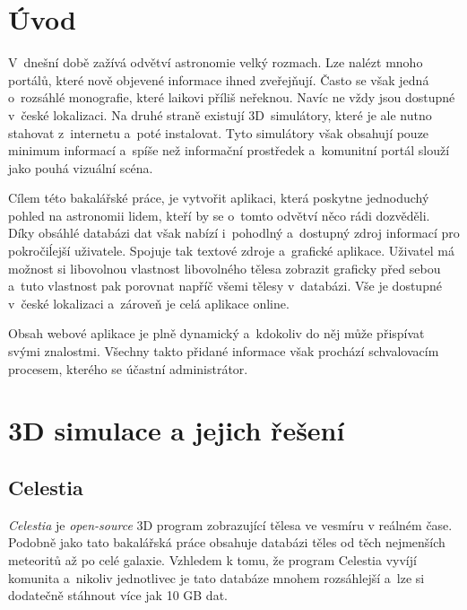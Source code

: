 \documentclass[a4paper,12pt]{article}
\begin{document}

\clearpage
\pagestyle{plain}		%

 {}
\section*{Úvod}
\label{uvod}

V~dnešní době zažívá odvětví astronomie velký rozmach. Lze nalézt mnoho portálů, které nově objevené informace ihned zveřejňují. Často se však jedná o~rozsáhlé monografie, které laikovi příliš neřeknou. Navíc ne vždy jsou dostupné v~české lokalizaci. Na druhé straně existují 3D~simulátory, které je ale nutno stahovat z~internetu a~poté instalovat. Tyto simulátory však obsahují pouze minimum informací a~spíše než informační prostředek a~komunitní portál slouží jako pouhá vizuální scéna.

Cílem této bakalářské práce, je vytvořit aplikaci, která poskytne jednoduchý pohled na astronomii lidem, kteří by se o~tomto odvětví něco rádi  dozvěděli. Díky obsáhlé databázi dat však nabízí i~pohodlný a~dostupný zdroj informací pro pokročiĺejší uživatele. Spojuje tak textové zdroje a~grafické aplikace. Uživatel má možnost 
si libovolnou vlastnost libovolného tělesa zobrazit graficky před sebou a~tuto vlastnost pak porovnat napříč všemi tělesy v~databázi. Vše je dostupné v~české lokalizaci a~zároveň je celá aplikace online.

Obsah webové aplikace je plně dynamický a~kdokoliv do něj může přispívat svými znalostmi. Všechny takto přidané informace však prochází schvalovacím procesem, kterého se účastní administrátor.



\section{3D simulace a jejich řešení}



\subsection{Celestia}

\textit{Celestia} je \textit{open-source} 3D program zobrazující tělesa ve vesmíru v reálném čase. Podobně jako tato bakalářská práce obsahuje databázi těles od těch nejmenších meteoritů až po celé galaxie. Vzhledem k tomu, že program Celestia vyvíjí komunita a~nikoliv jednotlivec je tato databáze mnohem rozsáhlejší a~lze si dodatečně stáhnout více jak 10 GB dat.
\end{document}

